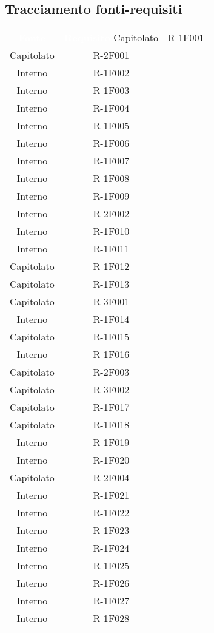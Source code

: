 \subsection{Tracciamento fonti-requisiti} 
\begin{tabularx}{\textwidth}{c|c}
	
	\rowcolor{greySWEight}
	\textcolor{white}{\textbf{Fonte}} &
	\textcolor{white}{\textbf{Requisito}}\endhead
		Capitolato & R-1F001 \\
		Capitolato & R-2F001 \\
		Interno & R-1F002 \\
		Interno & R-1F003 \\
		Interno & R-1F004 \\
		Interno & R-1F005 \\
		Interno & R-1F006 \\
		Interno & R-1F007 \\
		Interno & R-1F008 \\
		Interno & R-1F009 \\
		Interno & R-2F002 \\
		Interno & R-1F010 \\
		Interno & R-1F011 \\
		Capitolato & R-1F012 \\
		Capitolato & R-1F013 \\
		Capitolato & R-3F001 \\
		Interno & R-1F014 \\
		Capitolato & R-1F015 \\
		Interno & R-1F016 \\
		Capitolato & R-2F003 \\
		Capitolato & R-3F002 \\
		Capitolato & R-1F017 \\
		Capitolato & R-1F018 \\
		Interno & R-1F019 \\
		Interno & R-1F020 \\
		Capitolato & R-2F004 \\
		Interno & R-1F021 \\
		Interno & R-1F022 \\
		Interno & R-1F023 \\
		Interno & R-1F024 \\
		Interno & R-1F025 \\
		Interno & R-1F026 \\
		Interno & R-1F027 \\
		Interno & R-1F028 \\

\end{tabularx}
